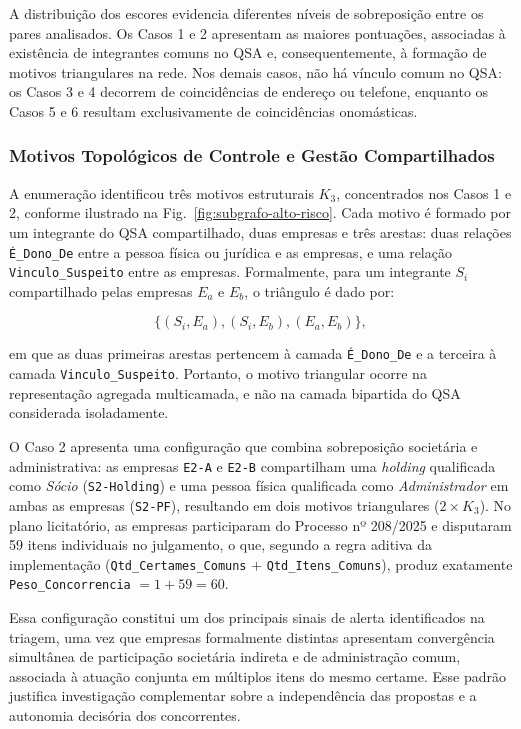 A distribuição dos escores evidencia diferentes níveis de sobreposição entre os pares analisados. Os Casos 1 e 2 apresentam as maiores pontuações, associadas à existência de integrantes comuns no QSA e, consequentemente, à formação de motivos triangulares na rede. Nos demais casos, não há vínculo comum no QSA: os Casos 3 e 4 decorrem de coincidências de endereço ou telefone, enquanto os Casos 5 e 6 resultam exclusivamente de coincidências onomásticas.

\subsubsection{Motivos Topológicos de Controle e Gestão Compartilhados}

A enumeração identificou três motivos estruturais $K_3$, concentrados nos Casos 1 e 2, conforme ilustrado na Fig.~\ref{fig:subgrafo-alto-risco}. Cada motivo é formado por um integrante do QSA compartilhado, duas empresas e três arestas: duas relações \texttt{É\_Dono\_De} entre a pessoa física ou jurídica e as empresas, e uma relação \texttt{Vinculo\_Suspeito} entre as empresas. Formalmente, para um integrante $S_i$ compartilhado pelas empresas $E_a$ e $E_b$, o triângulo é dado por:

\begin{equation}
  \{(S_i,E_a),(S_i,E_b),(E_a,E_b)\},
  \label{eq:motivo_k3}
\end{equation}

em que as duas primeiras arestas pertencem à camada \texttt{É\_Dono\_De} e a terceira à camada \texttt{Vinculo\_Suspeito}. Portanto, o motivo triangular ocorre na representação agregada multicamada, e não na camada bipartida do QSA considerada isoladamente.

O Caso 2 apresenta uma configuração que combina sobreposição societária e administrativa: as empresas \texttt{E2-A} e \texttt{E2-B} compartilham uma \textit{holding} qualificada como \textit{Sócio} (\texttt{S2-Holding}) e uma pessoa física qualificada como \textit{Administrador} em ambas as empresas (\texttt{S2-PF}), resultando em dois motivos triangulares ($2 \times K_3$). No plano licitatório, as empresas participaram do Processo nº 208/2025 e disputaram 59 itens individuais no julgamento, o que, segundo a regra aditiva da implementação (\texttt{Qtd\_Certames\_Comuns} $+$ \texttt{Qtd\_Itens\_Comuns}), produz exatamente \texttt{Peso\_Concorrencia} $= 1 + 59 = 60$.

Essa configuração constitui um dos principais sinais de alerta identificados na triagem, uma vez que empresas formalmente distintas apresentam convergência simultânea de participação societária indireta e de administração comum, associada à atuação conjunta em múltiplos itens do mesmo certame. Esse padrão justifica investigação complementar sobre a independência das propostas e a autonomia decisória dos concorrentes.

